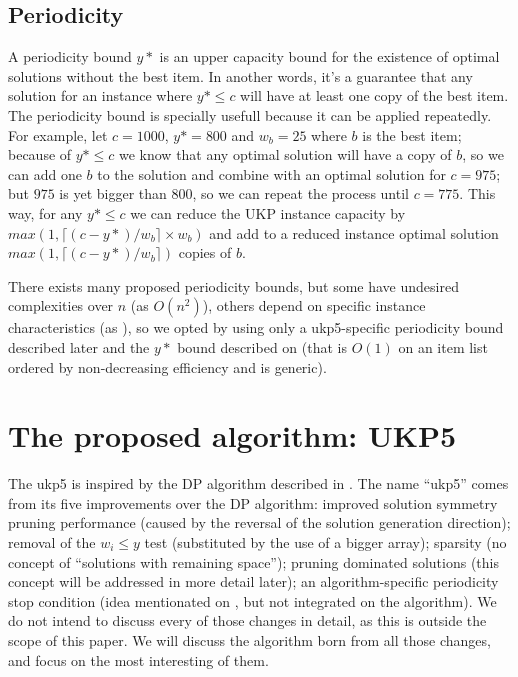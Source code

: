 \documentclass[runningheads,a4paper]{llncs}
\begin{document}

\subsection{Periodicity}

A periodicity bound \(y*\) is an upper capacity bound for the existence of optimal solutions without the best item. In another words, it's a guarantee that any solution for an instance where \(y* \leq c\) will have at least one copy of the best item. The periodicity bound is specially usefull because it can be applied repeatedly. For example, let \(c = 1000\), \(y* = 800\) and \(w_b = 25\) where \(b\) is the best item; because of \(y* \leq c\) we know that any optimal solution will have a copy of \(b\), so we can add one \(b\) to the solution and combine with an optimal solution for \(c = 975\); but \(975\) is yet bigger than \(800\), so we can repeat the process until \(c = 775\). This way, for any \(y* \leq c\) we can reduce the UKP instance capacity by \(max(1, \lceil(c-y*)/w_b\rceil\times w_b)\) and add to a reduced instance optimal solution \(max(1, \lceil(c-y*)/w_b\rceil)\) copies of \(b\).

There exists many proposed periodicity bounds, but some have undesired complexities over \(n\) (as \(O(n^2)\)\cite{CBADBOUND}), others depend on specific instance characteristics (as \cite{BADBOUND2}\cite{CPYA}), so we opted by using only a ukp5-specific periodicity bound described later and the \(y*\) bound described on \cite[p. 223]{CGAR} (that is \(O(1)\) on an item list ordered by non-decreasing efficiency and is generic).

\section{The proposed algorithm: UKP5}

The ukp5 is inspired by the DP algorithm described in \cite[p. 221]{CGAR}. The name ``ukp5'' comes from its five improvements over the \cite{CGAR} DP algorithm: improved solution symmetry pruning performance (caused by the reversal of the solution generation direction); removal of the \(w_i \leq y\) test (substituted by the use of a bigger array); sparsity (no concept of ``solutions with remaining space''); pruning dominated solutions (this concept will be addressed in more detail later); an algorithm-specific periodicity stop condition (idea mentionated on \cite{CGAR}, but not integrated on the algorithm). We do not intend to discuss every of those changes in detail, as this is outside the scope of this paper. We will discuss the algorithm born from all those changes, and focus on the most interesting of them.
\end{document}
